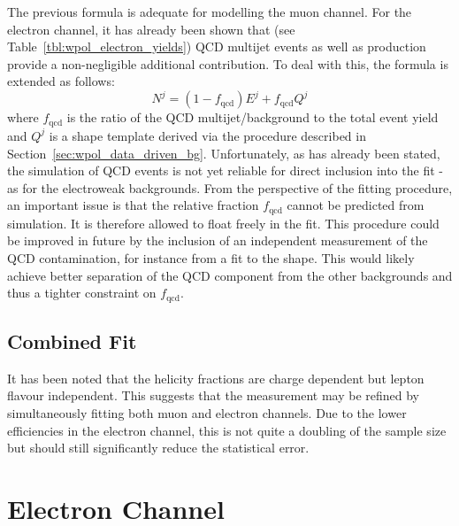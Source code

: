 The previous formula is adequate for modelling the muon channel. For the
electron channel, it has already been shown that (see
Table~\ref{tbl:wpol_electron_yields}) \ac{QCD} multijet events as well as
\gammajets production provide a non-negligible additional contribution. To deal
with this, the formula is extended as follows:
\begin{equation}
N^j = (1 - f_{\textrm{qcd}}) E^j + f_{\textrm{qcd}}Q^j
\end{equation}
where $f_{\textrm{qcd}}$ is the ratio of the QCD multijet/\gammajets background
to the total event yield and $Q^j$ is a shape template derived via the procedure
described in Section~\ref{sec:wpol_data_driven_bg}. Unfortunately, as has
already been stated, the simulation of QCD events is not yet reliable for direct
inclusion into the fit - as for the electroweak backgrounds. From the
perspective of the fitting procedure, an important issue is that the relative
fraction $f_{\textrm{qcd}}$ cannot be predicted from simulation. It is therefore
allowed to float freely in the fit. This procedure could be improved in future
by the inclusion of an independent measurement of the \ac{QCD} contamination,
for instance from a fit to the \MET shape. This would likely achieve better
separation of the \ac{QCD} component from the other backgrounds and thus a
tighter constraint on $f_{\textrm{qcd}}$.

\subsection{Combined Fit}
It has been noted that the helicity fractions are charge dependent but lepton
flavour independent. This suggests that the measurement may be refined by
simultaneously fitting both muon and electron channels. Due to the lower
efficiencies in the electron channel, this is not quite a doubling of the sample
size but should still significantly reduce the statistical error.


\section{Electron Channel}
